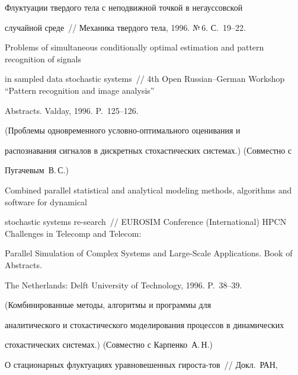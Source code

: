  Флуктуации твердого тела с неподвижной точкой в негауссовской


случайной среде~// Механика твердого тела, 1996. №\,6. С.~19--22.





Problems of simultaneous conditionally optimal estimation and pattern recognition of signals


in sampled data stochastic systems~// 4th Open Russian--German Workshop ``Pattern recognition and image analysis''


Abstracts. Valday, 1996. P.~125--126.


(Проблемы одновременного условно-оптимального оценивания и


распознавания сигналов в дискретных стохастических сис\-те\-мах.) (Совместно с


Пугачевым~В.\,С.)





Combined parallel statistical and analytical modeling methods, algorithms and software for dynamical


stochastic systems re-\linebreak search~// EUROSIM Conference (International) HPCN Challenges in Telecomp and Telecom:


Parallel Simulation of Complex Systems and Large-Scale Applications. Book of Abstracts.


The Netherlands: Delft University of Technology, 1996. P.~38--39.


(Комбинированные методы, алгоритмы и программы для


аналитического и стохастического моделирования процессов в динамических


стохастических системах.) (Совместно с Карпенко~А.\,Н.)
















 О стационарных флуктуациях уравновешенных гироста-\linebreak тов~// Докл.\ РАН,


